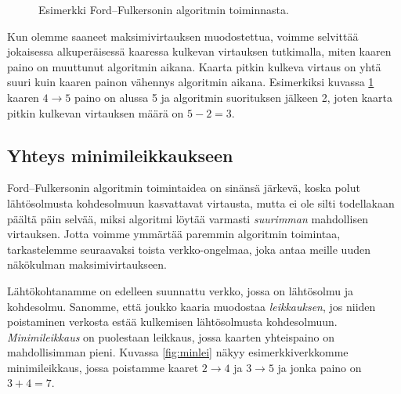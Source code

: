 \begin{figure}
\begin{center}
\end{center}
\caption{Esimerkki Ford–Fulkersonin algoritmin toiminnasta.}
\label{fig:floesi}
\end{figure}

Kun olemme saaneet maksimivirtauksen muodostettua,
voimme selvittää jokaisessa alkuperäisessä kaaressa kulkevan
virtauksen tutkimalla, miten kaaren paino on muuttunut algoritmin aikana.
Kaarta pitkin kulkeva virtaus on yhtä suuri kuin kaaren painon
vähennys algoritmin aikana.
Esimerkiksi kuvassa \ref{fig:floesi} kaaren $4 \rightarrow 5$
paino on alussa 5 ja algoritmin suorituksen jälkeen 2,
joten kaarta pitkin kulkevan virtauksen määrä on $5-2=3$.

\subsection{Yhteys minimileikkaukseen}


Ford–Fulkersonin algoritmin toimintaidea on sinänsä järkevä,
koska polut lähtösolmusta kohdesolmuun kasvattavat virtausta,
mutta ei ole silti todellakaan päältä päin selvää,
miksi algoritmi löytää varmasti \emph{suurimman} mahdollisen virtauksen.
Jotta voimme ymmärtää paremmin algoritmin toimintaa,
tarkastelemme seuraavaksi toista verkko-ongelmaa,
joka antaa meille uuden näkökulman maksimivirtaukseen.

Lähtökohtanamme on edelleen suunnattu verkko,
jossa on lähtösolmu ja kohdesolmu.
Sanomme, että joukko kaaria muodostaa \emph{leikkauksen},
jos niiden poistaminen verkosta estää kulkemisen
lähtösolmusta kohdesolmuun.
\emph{Minimileikkaus} on puolestaan leikkaus,
jossa kaarten yhteispaino on mahdollisimman pieni.
Kuvassa \ref{fig:minlei} näkyy esimerkkiverkkomme minimileikkaus,
jossa poistamme kaaret $2 \rightarrow 4$ ja $3 \rightarrow 5$
ja jonka paino on $3+4=7$.

